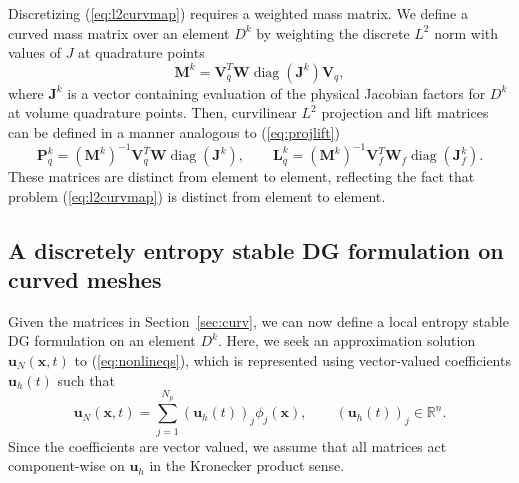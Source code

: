 \documentclass[preprint,10pt]{article}
\theoremstyle{definition}
\theoremstyle{lemma}
\theoremstyle{theorem}
\theoremstyle{assumption}
\DeclareMathOperator{\diag}{diag}
\newcommand{\LRp}[1]{\left( #1 \right)}
\begin{document}
{Discretizing (\ref{eq:l2curvmap}) requires a weighted mass matrix.  We define a curved mass matrix over an element $D^k$ by weighting the discrete $L^2$ norm with values of $J$ at quadrature points
\begin{equation}
\bm{M}^k = \bm{V}_q^T \bm{W}\diag\LRp{\bm{J}^k}\bm{V}_q,
\label{eq:curvedmass}
\end{equation}
where $\bm{J}^k$ is a vector containing evaluation of the physical Jacobian factors for $D^k$ at volume quadrature points.
Then, curvilinear $L^2$ projection and lift matrices can be defined in a manner analogous to (\ref{eq:projlift})
\begin{equation}
\bm{P}^k_q = \LRp{\bm{M}^k}^{-1}\bm{V}_q^T\bm{W}\diag\LRp{\bm{J}^k}, \qquad \bm{L}^k_q = \LRp{\bm{M}^k}^{-1}\bm{V}_f^T\bm{W}_f\diag\LRp{\bm{J}^k_f}.
\label{eq:projliftcurved}
\end{equation}
These matrices are distinct from element to element, reflecting the fact that problem (\ref{eq:l2curvmap}) is distinct from element to element.  

\subsection{A discretely entropy stable DG formulation on curved meshes}

Given the matrices in Section~\ref{sec:curv}, we can now define a local entropy stable DG formulation on an element $D^k$.  Here, we seek an approximation solution $\bm{u}_N(\bm{x},t)$ to (\ref{eq:nonlineqs}), which is represented using vector-valued coefficients $\bm{u}_h(t)$ such that
\[
\bm{u}_N(\bm{x},t) = \sum_{j=1}^{N_p} \LRp{\bm{u}_h(t)}_j \phi_j(\bm{x}), \qquad \LRp{\bm{u}_h(t)}_j \in \mathbb{R}^n.
\]
Since the coefficients are vector valued, we assume that all matrices act component-wise on $\bm{u}_h$ in the Kronecker product sense.  

}
\end{document}
